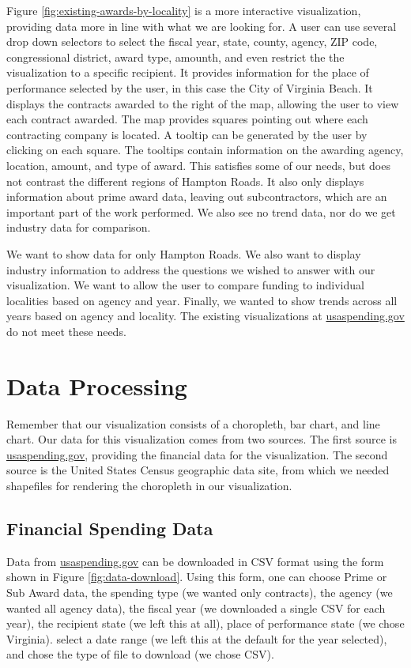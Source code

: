 \documentclass[10pt,journal,compsoc]{IEEEtran}
\begin{document}
Figure \ref{fig:existing-awards-by-locality} is a more interactive visualization, providing data more in line with what we are looking for.  A user can use several drop down selectors to select the fiscal year, state, county, agency, ZIP code, congressional district, award type, amounth, and even restrict the the visualization to a specific recipient.  It provides information for the place of performance selected by the user, in this case the City of Virginia Beach.  It displays the contracts awarded to the right of the map, allowing the user to view each contract awarded.  The map provides squares pointing out where each contracting company is located.  A tooltip can be generated by the user by clicking on each square.  The tooltips contain information on the awarding agency, location, amount, and type of award.  This satisfies some of our needs, but does not contrast the different regions of Hampton Roads.  It also only displays information about prime award data, leaving out subcontractors, which are an important part of the work performed.  We also see no trend data, nor do we get industry data for comparison.

We want to show data for only Hampton Roads.  We also want to display industry information to address the questions we wished to answer with our visualization.  We want to allow the user to compare funding to individual localities based on agency and year.  Finally, we wanted to show trends across all years based on agency and locality.  The existing visualizations at \url{usaspending.gov} do not meet these needs.

\section{Data Processing}

Remember that our visualization consists of a choropleth, bar chart, and line chart.  Our data for this visualization comes from two sources.   The first source is \url{usaspending.gov}, providing the financial data for the visualization.  The second source is the United States Census geographic data site, from which we needed shapefiles for rendering the choropleth in our visualization.

\subsection{Financial Spending Data}

Data from \url{usaspending.gov} can be downloaded in CSV format using the form shown in Figure \ref{fig:data-download}.  Using this form, one can choose Prime or Sub Award data, the spending type (we wanted only contracts), the agency (we wanted all agency data), the fiscal year (we downloaded a single CSV for each year), the recipient state (we left this at all), place of performance state (we chose Virginia). select a date range (we left this at the default for the year selected), and chose the type of file to download (we chose CSV).
\end{document}
